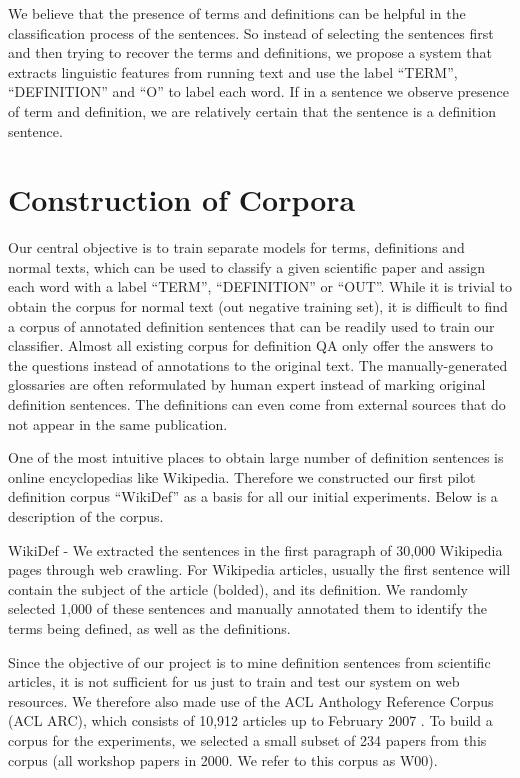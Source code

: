 \documentclass[hyp]{socreport}
\begin{document}
We believe that the presence of terms and definitions can be helpful in the classification
process of the sentences. So instead of selecting the sentences first and then trying to
recover the terms and definitions, we propose a system that extracts linguistic features
from running text and use the label ``TERM'', ``DEFINITION'' and ``O'' to label each
word. If in a sentence we observe presence of term and definition, we are relatively
certain that the sentence is a definition sentence.

\chapter{Construction of Corpora}

Our central objective is to train separate models for terms, definitions and normal texts,
which can be used to classify a given scientific paper and assign each word with a label
``TERM'', ``DEFINITION'' or ``OUT''. While it is trivial to obtain the corpus for normal
text (out negative training set), it is difficult to find a corpus of annotated definition
sentences that can be readily used to train our classifier. Almost all existing corpus for
definition QA only offer the answers to the questions instead of annotations to the
original text. The manually-generated glossaries are often reformulated by human expert instead of marking original definition sentences. The definitions can even come from
external sources that do not appear in the same publication.

One of the most intuitive places to obtain large number of definition sentences is online
encyclopedias like Wikipedia. Therefore we constructed our first pilot definition corpus
``WikiDef'' as a basis for all our initial experiments. Below is a description of the corpus.

WikiDef - We extracted the sentences in the first paragraph of 30,000 Wikipedia pages
through web crawling. For Wikipedia articles, usually the first sentence will contain the
subject of the article (bolded), and its definition. We randomly selected 1,000 of these
sentences and manually annotated them to identify the terms being defined, as well as the
definitions.

Since the objective of our project is to mine definition sentences from scientific articles,
it is not sufficient for us just to train and test our system on web resources. We therefore
also made use of the ACL Anthology Reference Corpus (ACL ARC), which consists of
10,912 articles up to February 2007 \cite{Birdtheacl}. To build a corpus for the experiments, we selected a small subset of 234 papers from this corpus (all workshop papers in 2000. We refer to
this corpus as W00).
\end{document}
